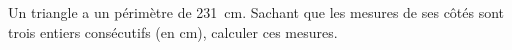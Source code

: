Un triangle a un périmètre de \qty{231}{\centi\metre}. 
Sachant que les mesures de ses côtés sont trois entiers consécutifs (en \unit{\centi\metre}), calculer ces mesures.